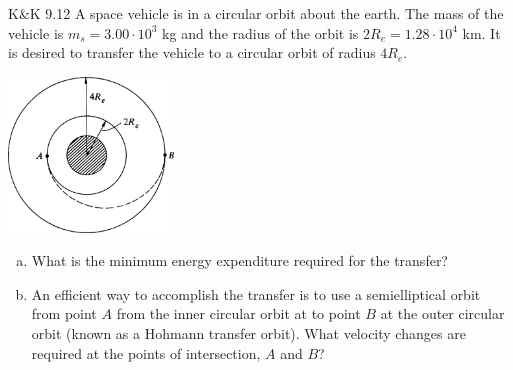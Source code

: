 \documentclass{esg8012pset}
\begin{document}
\begin{problem}{K\&K 9.12}
  A space vehicle is in a circular orbit about the earth. The mass of the vehicle is $m_s = 3.00 \cdot 10^3$ kg and the radius of the orbit is $2R_e = 1.28 \cdot 10^4$ km. It is desired to transfer the vehicle to a circular orbit of radius $4R_e$.
  \begin{center}\includegraphics[width=0.33\textwidth]{ps10_2}\end{center}
  \begin{enumerate}[(a)]
    \item What is the minimum energy expenditure required for the transfer?
    \item An efficient way to accomplish the transfer is to use a semielliptical orbit from point $A$ from the inner circular orbit at to point $B$ at the outer circular orbit (known as a Hohmann transfer orbit). What velocity changes are required at the points of intersection, $A$ and $B$?
  \end{enumerate}
\end{problem}
\end{document}

